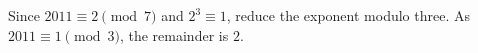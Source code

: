 Since $2011\equiv2\pmod7$ and $2^3\equiv1$, reduce the exponent modulo three. As $2011\equiv1\pmod3$, the remainder is $\boxed2$.
